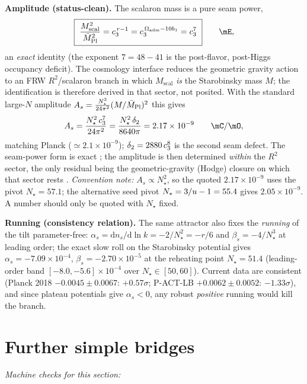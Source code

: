 \noindent\textbf{Amplitude (status-clean).} The scalaron mass is a pure seam power,
\begin{equation}
  \boxed{\ \frac{M_{\mathrm{scal}}^2}{\Mbar^2}=\cthree^{\,r-1}=\cthree^{\,\Oadm-10b_1}=\cthree^7\ }\qquad\mE ,
\end{equation}
an \emph{exact} identity (the exponent $7=48-41$ is the post-flavor, post-Higgs occupancy deficit).
The cosmology interface reduces the geometric gravity action to an FRW $R^2$/scalaron branch in which $M_{\mathrm{scal}}$
\emph{is} the Starobinsky mass $M$; the identification is therefore derived in that sector, not posited.
With the standard large-$N$ amplitude $A_s=\tfrac{N_\star^2}{24\pi^2}(M/\bar M_{\mathrm{Pl}})^2$ this gives
\begin{equation}
  A_s=\frac{N_\star^2\,\cthree^7}{24\pi^2}=\frac{N_\star^2\,\dtwo}{8640\pi}=2.17\times10^{-9}\qquad\mC/\mO ,
\end{equation}
matching Planck ($\simeq2.1\times10^{-9}$); $\delta_2=2880\,c_3^8$ is the second seam defect. The
seam-power form is exact \mE; the amplitude is then determined \emph{within} the $R^2$ sector, the only
residual being the geometric-gravity (Hodge) closure on which that sector rests \mC. \emph{Convention
note:} $A_s\propto N_\star^2$, so
the quoted $2.17\times10^{-9}$ uses the pivot $N_\star=57.1$; the alternative seed pivot $N_\star=3/u-1=55.4$
gives $2.05\times10^{-9}$. A number should only be quoted with $N_\star$ fixed.

\noindent\textbf{Running (consistency relation).} The same attractor also fixes the \emph{running}
of the tilt parameter-free: $\alpha_s=\mathrm dn_s/\mathrm d\ln k=-2/N_\star^2=-r/6$ and
$\beta_s=-4/N_\star^3$ at leading order; the exact slow roll on the Starobinsky potential gives
$\alpha_s=-7.09\times10^{-4}$, $\beta_s=-2.70\times10^{-5}$ at the reheating point $N_\star{=}51.4$
(leading-order band $[-8.0,-5.6]\times10^{-4}$ over $N_\star\in[50,60]$). Current data are
consistent (Planck 2018 $-0.0045\pm0.0067$: $+0.57\sigma$; P-ACT-LB $+0.0062\pm0.0052$:
$-1.33\sigma$), and since plateau potentials give $\alpha_s<0$, any robust \emph{positive} running
would kill the branch. \mC\ 

\section{Further simple bridges}
\noindent\emph{Machine checks for this section:} 


